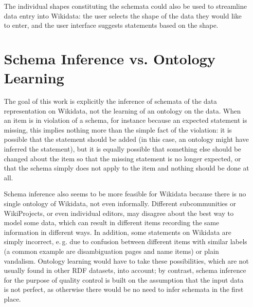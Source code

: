 \documentclass{scrartcl}
\begin{document}
The individual shapes constituting the schemata could also be used to streamline data entry into Wikidata:
the user selects the shape of the data they would like to enter,
and the user interface suggests statements based on the shape.

\section{Schema Inference vs. Ontology Learning}

The goal of this work is explicitly the inference of schemata of the data representation on Wikidata,
not the learning of an ontology on the data.
When an item is in violation of a schema,
for instance because an expected statement is missing,
this implies nothing more than the simple fact of the violation:
it is possible that the statement should be added
(in this case, an ontology might have inferred the statement),
but it is equally possible that something else should be changed about the item so that the missing statement is no longer expected,
or that the schema simply does not apply to the item and nothing should be done at all.

Schema inference also seems to be more feasible for Wikidata because there is no single ontology of Wikidata, not even informally.
Different subcommunities or WikiProjects, or even individual editors, may disagree about the best way to model some data,
which can result in different items recording the same information in different ways.
In addition, some statements on Wikidata are simply incorrect, e.\,g. due to confusion between different items with similar labels
(a common example are disambiguation pages and name items)
or plain vandalism.
Ontology learning would have to take these possibilities, which are not usually found in other RDF datasets, into account;
by contrast, schema inference for the purpose of quality control is built on the assumption that the input data is not perfect,
as otherwise there would be no need to infer schemata in the first place.
\end{document}
